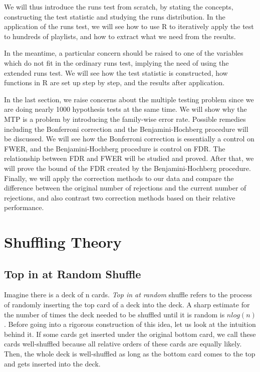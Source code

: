 \documentclass[12pt]{article}
\theoremstyle{plain}
\theoremstyle{definition}
\theoremstyle{remark}
\begin{document}
We will thus introduce the runs test from scratch, by stating the concepts, constructing the test statistic and studying the runs distribution. In the application of the runs test, we will see how to use R to iteratively apply the test to hundreds of playlists, and how to extract what we need from the results. 

In the meantime, a particular concern should be raised to one of the variables which do not fit in the ordinary runs test, implying the need of using the extended runs test. We will see how the test statistic is constructed, how functions in R are set up step by step, and the results after application. 

In the last section, we raise concerns about the multiple testing problem since we are doing nearly 1000 hypothesis tests at the same time. We will show why the MTP is a problem by introducing the family-wise error rate. Possible remedies including the Bonferroni correction and the Benjamini-Hochberg procedure will be discussed. We will see how the Bonferroni correction is essentially a control on FWER, and the Benjamini-Hochberg procedure is control on FDR. The relationship between FDR and FWER will be studied and proved. After that, we will prove the bound of the FDR created by the Benjamini-Hochberg procedure. Finally, we will apply the correction methods to our data and compare the difference between the original number of rejections and the current number of rejections, and also contrast two correction methods based on their relative performance. 
\clearpage
\section{Shuffling Theory}
\subsection{Top in at Random Shuffle}

Imagine there is a deck of n cards. \textit{Top in at random}\cite[Example~1 on \pno~333]{1.1} shuffle refers to the process of randomly inserting the top card of a deck into the deck. A sharp estimate for the number of times the deck needed to be shuffled until it is random is $nlog(n)$. Before going into a rigorous construction of this idea, let us look at the intuition behind it. If some cards get inserted under the original bottom card, we call these cards well-shuffled because all relative orders of these cards are equally likely. Then, the whole deck is well-shuffled as long as the bottom card comes to the top and gets inserted into the deck. 
\end{document}

